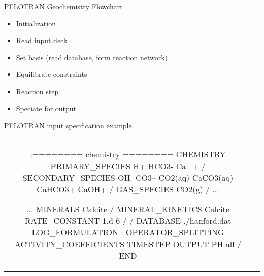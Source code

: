 \documentclass{beamer}
\newcommand{\pft}{PFLOTRAN\xspace}
\newcommand\bluecolor[1]{{{\color{blue} #1}}}
\newcommand\greencolor[1]{{{\color{green} #1}}}
\def\aligntop#1{\vtop{\null\hbox{#1}}}
\begin{document}
\begin{frame}{\pft Geochemistry Flowchart}
\begin{itemize}
\item Initialization
\item Read input deck
\item Set basis (read database, form reaction network)
\item Equilibrate constraints
\item Reaction step
\item Speciate for output
\end{itemize}
\end{frame}

\begin{frame}{PFLOTRAN input specification example}
\footnotesize
\begin{tabular}{cc}
\begin{minipage}{0.5\textwidth}
\begin{semiverbatim}
\greencolor{:======== chemistry ========}
\bluecolor{CHEMISTRY}
  \bluecolor{PRIMARY_SPECIES}
    H+
    HCO3-
    Ca++
  \bluecolor{/}
  \bluecolor{SECONDARY_SPECIES}
    OH-
    CO3--
    CO2(aq)
    CaCO3(aq)
    CaHCO3+
    CaOH+
  \bluecolor{/}
  \bluecolor{GAS_SPECIES}
    CO2(g)
  \bluecolor{/}
  ...
\end{semiverbatim}
\end{minipage}
\begin{minipage}{0.5\textwidth}
\begin{semiverbatim}
  ...
  \bluecolor{MINERALS}
    Calcite
  \bluecolor{/}
  \bluecolor{MINERAL_KINETICS}
    Calcite
      \bluecolor{RATE_CONSTANT} 1.d-6
    \bluecolor{/}
  \bluecolor{/}
  \bluecolor{DATABASE} ./hanford.dat
  \bluecolor{LOG_FORMULATION}
\greencolor{:  OPERATOR_SPLITTING}
  \bluecolor{ACTIVITY_COEFFICIENTS TIMESTEP}
  \bluecolor{OUTPUT}
    PH
    all
  \bluecolor{/}
\bluecolor{END}
\end{semiverbatim}
\end{minipage}
\end{tabular}
\end{frame}

\end{document}
